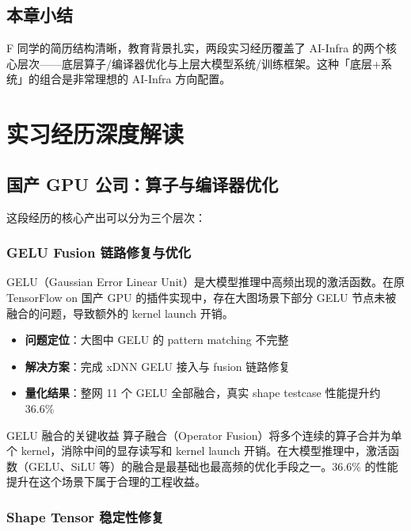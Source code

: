 \documentclass[a4paper]{article}
\begin{document}
\subsection{本章小结}
F 同学的简历结构清晰，教育背景扎实，两段实习经历覆盖了 AI-Infra 的两个核心层次——底层算子/编译器优化与上层大模型系统/训练框架。这种「底层+系统」的组合是非常理想的 AI-Infra 方向配置。

\section{实习经历深度解读}

\subsection{国产 GPU 公司：算子与编译器优化}

这段经历的核心产出可以分为三个层次：

\subsubsection{GELU Fusion 链路修复与优化}

GELU（Gaussian Error Linear Unit）是大模型推理中高频出现的激活函数。在原 TensorFlow on 国产 GPU 的插件实现中，存在大图场景下部分 GELU 节点未被融合的问题，导致额外的 kernel launch 开销。

\begin{itemize}
    \item \textbf{问题定位}：大图中 GELU 的 pattern matching 不完整
    \item \textbf{解决方案}：完成 xDNN GELU 接入与 fusion 链路修复
    \item \textbf{量化结果}：整网 11 个 GELU 全部融合，真实 shape testcase 性能提升约 36.6\%
\end{itemize}

\begin{importantbox}{GELU 融合的关键收益}
算子融合（Operator Fusion）将多个连续的算子合并为单个 kernel，消除中间的显存读写和 kernel launch 开销。在大模型推理中，激活函数（GELU、SiLU 等）的融合是最基础也最高频的优化手段之一。36.6\% 的性能提升在这个场景下属于合理的工程收益。
\end{importantbox}

\subsubsection{Shape Tensor 稳定性修复}
\end{document}
